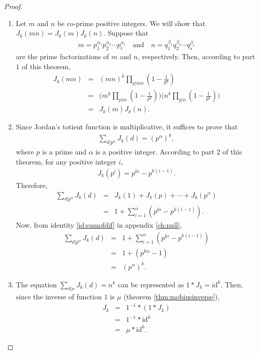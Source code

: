 \documentclass[12pt]{subfile}
\begin{document}
\begin{proof}
\begin{enumerate}
				\item Let $m$ and $n$ be co-prime positive integers. We will show that $J_k(mn)=J_k(m)J_k(n)$. Suppose that
					\begin{align*}
						m = p_1^{\alpha_1}p_2^{\alpha_2} \cdots p_t^{\alpha_t} \quad \text{and} \quad n = q_1^{\beta_1}q_2^{\beta_2} \cdots q_s^{\beta_s}
					\end{align*}
				are the prime factorizations of  $m$ and $n$, respectively. Then, according to part $1$ of this theorem,
					\begin{eqnarray*}
						J_k(mn) &=& (mn)^{k} \prod\limits_{p|mn} \left(1 - \frac{1}{p^k}\right)\\
								&=& \Bigg(m^k \prod\limits_{p|m} \left(1 - \frac{1}{p^k}\right)\Bigg) \Bigg(n^k \prod\limits_{p|n} \left(1 - \frac{1}{p^k}\right)\Bigg) \\
								&=& J_k(m)J_k(n).
					\end{eqnarray*}
					
				\item Since Jordan's totient function is multiplicative, it suffices to prove that
					\begin{align*}
						\sum\limits_{d|p^\alpha} J_k(d) = (p^{\alpha})^k,
					\end{align*}
				where $p$ is a prime and $\alpha$ is a positive integer. According to part $2$ of this theorem, for any positive integer $i$,
					\begin{align*}
						J_k(p^i) = p^{ki} - p^{k (i -1)}.
					\end{align*}
				Therefore,
					\begin{eqnarray*}
						\sum_{d|p^\alpha} J_k(d) &=& J_k(1) + J_k(p) + \cdots + J_k(p^\alpha)\\
											 &=& 1 + \sum_{i = 1}^{\alpha} \left(p^{ki} - p^{k (i -1)}\right).
					\end{eqnarray*}
				Now, from identity \eqref{id:sumofdif} in appendix \eqref{ch:null},
					\begin{eqnarray*}
						\sum_{d|p^\alpha} J_k(d) &=& 1 + \sum_{i = 1}^{\alpha} \left(p^{ki} - p^{k (i -1)}\right)\\
											 &=& 1 + \left(p^{k \alpha}-1\right)\\
											 &=& (p^{\alpha})^k.
					\end{eqnarray*}
				
				\item The equation $\displaystyle \sum_{d|n} J_k(d) = n^k$ can be represented as $1 \ast J_k = \text{id}^k$. Then, since the inverse of function $1$ is $\mu$ (theorem \eqref{thm:mobiusinverse}),
					\begin{eqnarray*}
						J_k &=& 1^{-1} \ast (1 \ast J_k)\\
							&=& 1^{-1} \ast \text{id}^k\\
							&=& \mu \ast \text{id}^k.
					\end{eqnarray*}
				

\end{enumerate}
\end{proof}
\end{document}
